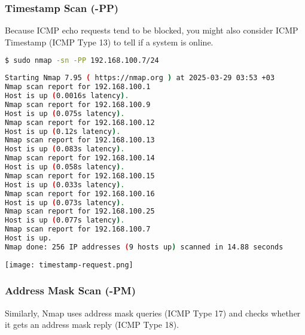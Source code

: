 \documentclass[11pt,a4paper]{article}
\newenvironment{commandbox}[1][]{
  \begin{tcolorbox}[
      colback=kalibackground,
      colframe=commandcolor,
      fonttitle=\bfseries\color{white},
      title=#1,
      breakable=true
    ]
  }{
  \end{tcolorbox}
}
\begin{document}
\clearpage

\subsubsection{Timestamp Scan (-PP)}

Because ICMP echo requests tend to be blocked, you might also
consider ICMP Timestamp (ICMP Type 13) to tell if a system is online.

\begin{commandbox}[ICMP Timestamp Scan (-PP)]
\begin{lstlisting}[language=bash, style=bash, basicstyle=\small\ttfamily\color{warningcolor}]
$ sudo nmap -sn -PP 192.168.100.7/24
\end{lstlisting}

\begin{lstlisting}[basicstyle=\small\ttfamily\color{kalitext}, language=bash, style=bash, breaklines=true, breakindent=0pt]
Starting Nmap 7.95 ( https://nmap.org ) at 2025-03-29 03:53 +03
Nmap scan report for 192.168.100.1
Host is up (0.0016s latency).
Nmap scan report for 192.168.100.9
Host is up (0.075s latency).
Nmap scan report for 192.168.100.12
Host is up (0.12s latency).
Nmap scan report for 192.168.100.13
Host is up (0.083s latency).
Nmap scan report for 192.168.100.14
Host is up (0.058s latency).
Nmap scan report for 192.168.100.15
Host is up (0.033s latency).
Nmap scan report for 192.168.100.16
Host is up (0.073s latency).
Nmap scan report for 192.168.100.25
Host is up (0.077s latency).
Nmap scan report for 192.168.100.7
Host is up.
Nmap done: 256 IP addresses (9 hosts up) scanned in 14.88 seconds
\end{lstlisting}
\end{commandbox}
\vspace{-5pt}

\begin{center}
  \texttt{[image: timestamp-request.png]}
  \label{fig:timestamp-request}
\end{center}

\clearpage
\subsubsection{Address Mask Scan (-PM)}

Similarly, Nmap uses address mask queries (ICMP Type 17) and checks
whether it gets an address mask reply (ICMP Type 18).
\end{document}
